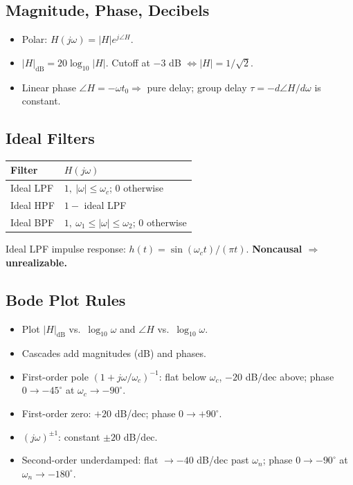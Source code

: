 \documentclass[11pt]{article}
\begin{document}
\subsection{Magnitude, Phase, Decibels}
\begin{itemize}[leftmargin=*]
  \item Polar: $H(j\omega) = |H|e^{j\angle H}$.
  \item $|H|_\text{dB} = 20\log_{10}|H|$. Cutoff at $-3$ dB $\Leftrightarrow |H|=1/\sqrt{2}$.
  \item Linear phase $\angle H = -\omega t_0 \Rightarrow$ pure delay; group delay $\tau = -d\angle H/d\omega$ is constant.
\end{itemize}

\subsection{Ideal Filters}
\begin{center}
\begin{tabular}{|l|l|}
\hline
Filter & $H(j\omega)$\\
\hline
Ideal LPF & $1,\ |\omega|\le\omega_c$; $0$ otherwise\\
Ideal HPF & $1-$ ideal LPF\\
Ideal BPF & $1,\ \omega_1 \le |\omega| \le \omega_2$; $0$ otherwise\\
\hline
\end{tabular}
\end{center}
Ideal LPF impulse response: $h(t)=\sin(\omega_c t)/(\pi t)$. \textbf{Noncausal $\Rightarrow$ unrealizable.}

\subsection{Bode Plot Rules}
\begin{itemize}[leftmargin=*]
  \item Plot $|H|_\text{dB}$ vs.\ $\log_{10}\omega$ and $\angle H$ vs.\ $\log_{10}\omega$.
  \item Cascades add magnitudes (dB) and phases.
  \item First-order pole $(1+j\omega/\omega_c)^{-1}$: flat below $\omega_c$, $-20$ dB/dec above; phase $0\to -45^\circ$ at $\omega_c \to -90^\circ$.
  \item First-order zero: $+20$ dB/dec; phase $0\to +90^\circ$.
  \item $(j\omega)^{\pm 1}$: constant $\pm 20$ dB/dec.
  \item Second-order underdamped: flat $\to -40$ dB/dec past $\omega_n$; phase $0\to -90^\circ$ at $\omega_n \to -180^\circ$.
\end{itemize}
\end{document}
